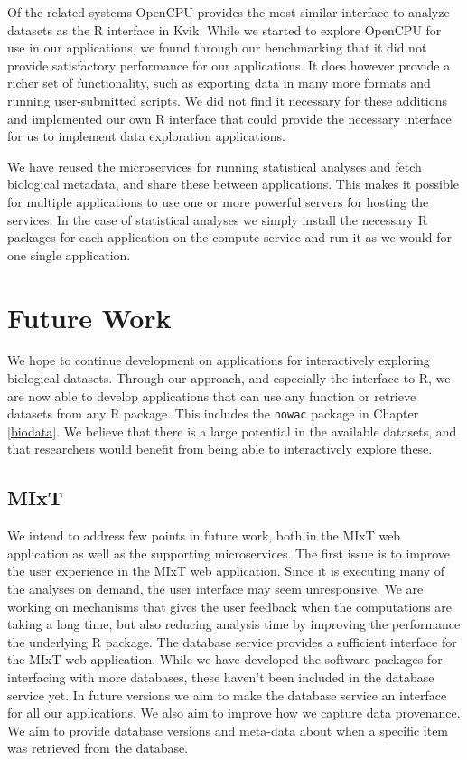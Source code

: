 Of the related systems OpenCPU provides the most similar interface to analyze
datasets as the R interface in Kvik. While we started to explore OpenCPU for use
in our applications, we found through our benchmarking that it did not provide
satisfactory performance for our applications. It does however provide a richer
set of functionality, such as exporting data in many more formats and running
user-submitted scripts. We did not find it necessary for these additions and
implemented our own R interface that could provide the necessary interface for
us to implement data exploration applications. 

We have reused the microservices for running statistical analyses and
fetch biological metadata, and share these between applications. This makes it
possible for multiple applications to use one or more powerful servers for
hosting the services. In the case of statistical analyses we simply install the
necessary R packages for each application on the compute service and run it as
we would for one single application. 

\section{Future Work} 
We hope to continue development on applications for interactively exploring
biological datasets. Through our approach, and especially the interface to R, 
we are now able to develop applications that can use any function or retrieve
datasets from any R package. This includes the \texttt{nowac} package in
Chapter \ref{biodata}. We believe that there is a large potential in the
available datasets, and that researchers would benefit from being able to
interactively explore these. 

\subsection{MIxT} 
We intend to address few points in future work, both in the
MIxT web application as well as the supporting microservices.  The first issue
is to improve the user experience in the MIxT web application.  Since it is
executing many of the analyses on demand, the user interface may seem
unresponsive. We are working on mechanisms that gives the user feedback when the
computations are taking a long time, but also reducing analysis time by
improving the performance the underlying R package. The database service
provides a sufficient interface for the MIxT web application. While we have
developed the software packages for interfacing with more databases, these
haven't been included in the database service yet. In future versions we aim to
make the database service an interface for all our applications.  We also aim to
improve how we capture data provenance. We aim to provide database versions and
meta-data about when a specific item was retrieved from the database. 

